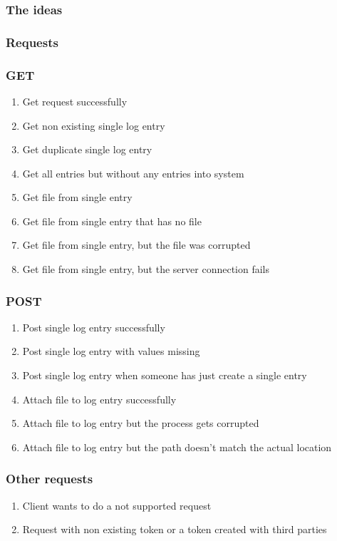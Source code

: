 \subsubsection{The ideas}

\subsubsection{Requests}

\subsubsection{GET}
\begin{enumerate}
\item Get request successfully
\item Get non existing single log entry
\item Get duplicate single log entry
\item Get all entries but without any entries into system
\item Get file from single entry
\item Get file from single entry that has no file
\item Get file from single entry, but the file was corrupted
\item Get file from single entry, but the server connection fails
\end{enumerate}

\subsubsection{POST}
\begin{enumerate}
\item Post single log entry successfully
\item Post single log entry with values missing
\item Post single log entry when someone has just create a single entry
\item Attach file to log entry successfully
\item Attach file to log entry but the process gets corrupted
\item Attach file to log entry but the path doesn't match the actual location
\end{enumerate}

\subsubsection{Other requests}
\begin{enumerate}
\item Client wants to do a not supported request
\item Request with non existing token or a token created with third parties

\end{enumerate}

